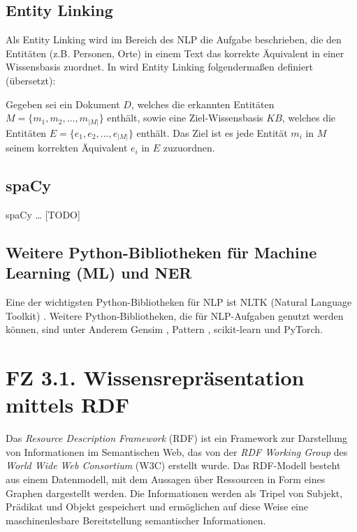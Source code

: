 \subsection{Entity Linking}
Als Entity Linking wird im Bereich des NLP die Aufgabe beschrieben, die den Entitäten (z.B. Personen, Orte) 
in einem Text das korrekte Äquivalent in einer Wissensbasis zuordnet.
In \cite{shen_entity_2021} wird Entity Linking folgendermaßen definiert (übersetzt):
\begin{defn}
Gegeben sei ein Dokument $D$, welches die erkannten Entitäten $M=\{m_1, m_2, \dots, m_{|M|}\}$ enthält, sowie
eine Ziel-Wissensbasis $KB$, welches die Entitäten $E=\{e_1, e_2, \dots, e_{|M|}\}$ enthält. Das Ziel ist es 
jede Entität $m_i$ in $M$ seinem korrekten Äquivalent $e_i$ in $E$ zuzuordnen.
\end{defn}

\subsection{spaCy}
spaCy \dots{} [TODO]

\subsection{Weitere Python-Bibliotheken für Machine Learning (ML) und NER}
Eine der wichtigsten Python-Bibliotheken für NLP ist NLTK (Natural Language Toolkit) \cite{bird2006nltk}.
Weitere Python-Bibliotheken, die für NLP-Aufgaben genutzt werden können, sind unter Anderem
Gensim \cite{vrehuuvrek2011gensim}, Pattern \cite{de2012pattern}\cite{github_pattern}, 
scikit-learn und PyTorch.

%
%
\section{FZ 3.1. Wissensrepräsentation mittels RDF}
\label{sec:fz3.1.} 

Das \emph{Resource Description Framework} (RDF) \citep{w3c_all_2022} ist ein Framework zur Darstellung von Informationen im Semantischen Web, das von der \emph{RDF Working Group} des  \emph{World Wide Web Consortium} (W3C) erstellt wurde. Das RDF-Modell besteht aus einem Datenmodell, mit dem Aussagen über Ressourcen in Form eines Graphen dargestellt werden. Die Informationen werden als Tripel von Subjekt, Prädikat und Objekt gespeichert und ermöglichen auf diese Weise eine maschinenlesbare Bereitstellung semantischer Informationen.

